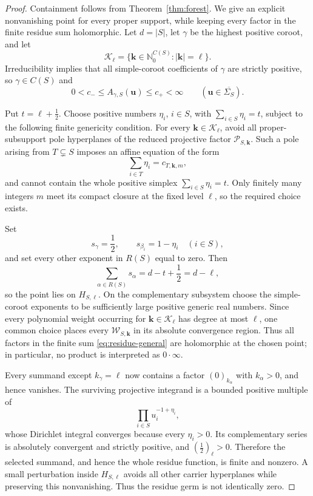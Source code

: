 \documentclass[11pt]{article}
\begin{document}
\begin{proof}
Containment follows from Theorem~\ref{thm:forest}.  We give an explicit
nonvanishing point for every proper support, while keeping every factor
in the finite residue sum holomorphic.  Let \(d=|S|\), let
\(\gamma\) be the highest positive coroot, and let
\[
 \mathscr K_\ell=\{\mathbf k\in\mathbb N_0^{C(S)}:|\mathbf k|=\ell\}.
\]
Irreducibility implies that all simple-coroot coefficients of \(\gamma\)
are strictly positive, so \(\gamma\in C(S)\) and
\[
 0<c_-\le A_{\gamma,S}(\mathbf u)\le c_+<\infty
 \qquad(\mathbf u\in\overline{\Sigma_S}).
\]

Put \(t=\ell+\tfrac12\).  Choose positive numbers \(\eta_i\), \(i\in S\),
with \(\sum_{i\in S}\eta_i=t\), subject to the following finite genericity
condition.  For every \(\mathbf k\in\mathscr K_\ell\), avoid all
proper-subsupport pole hyperplanes of the reduced projective factor
\(\mathcal P_{S,\mathbf k}\).  Such a pole arising from
\(T\subsetneq S\) imposes an affine equation of the form
\[
 \sum_{i\in T}\eta_i=c_{T,\mathbf k,m},
\]
and cannot contain the whole positive simplex
\(\sum_{i\in S}\eta_i=t\).  Only finitely many integers \(m\) meet its
compact closure at the fixed level \(\ell\), so the required choice
exists.

Set
\[
 s_\gamma=\frac12,\qquad
 s_{\beta_i}=1-\eta_i\quad(i\in S),
\]
and set every other exponent in \(R(S)\) equal to zero.  Then
\[
 \sum_{\alpha\in R(S)}s_\alpha
 =d-t+\frac12=d-\ell,
\]
so the point lies on \(H_{S,\ell}\).  On the complementary subsystem
choose the simple-coroot exponents to be sufficiently large positive
generic real numbers.  Since every polynomial weight occurring for
\(\mathbf k\in\mathscr K_\ell\) has degree at most \(\ell\), one common
choice places every \(\mathcal W_{S,\mathbf k}\) in its absolute
convergence region.  Thus all factors in the finite sum
\eqref{eq:residue-general} are holomorphic at the chosen point; in
particular, no product is interpreted as \(0\cdot\infty\).

Every summand except \(k_\gamma=\ell\) now contains a factor
\((0)_{k_\alpha}\) with \(k_\alpha>0\), and hence vanishes.  The surviving
projective integrand is a bounded positive multiple of
\[
 \prod_{i\in S}u_i^{-1+\eta_i},
\]
whose Dirichlet integral converges because every \(\eta_i>0\).  Its
complementary series is absolutely convergent and strictly positive, and
\((\tfrac12)_\ell>0\).  Therefore the selected summand, and hence the
whole residue function, is finite and nonzero.  A small perturbation
inside \(H_{S,\ell}\) avoids all other carrier hyperplanes while
preserving this nonvanishing.  Thus the residue germ is not identically
zero.


\end{proof}
\end{document}
